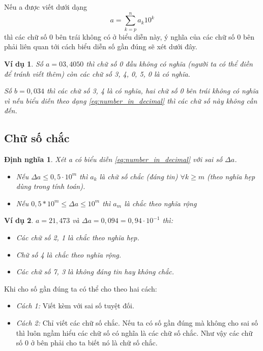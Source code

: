 \documentclass{book}    %
\newtheorem{definition}{Định nghĩa}
\newtheorem{exmp}{Ví dụ}[chapter]
\begin{document}
Nếu a được viết dưới dạng
\begin{equation} \label{eq:number_in_decimal}
    a = \sum_{k=p}^{n} a_k10^k
\end{equation}
thì các chữ số 0 bên trái không có ở biểu diễn này, ý nghĩa của các chữ số 0 bên
phải liên quan tới cách biểu diễn số gần đúng sẽ xét dưới đây.

\begin{exmp}
    Số \(a = 03,4050\) thì chữ số 0 đầu không có nghĩa (người ta có thể điền để
    tránh viết thêm) còn các chữ số 3, 4, 0, 5, 0 là có nghĩa.

    Số \(b = 0,034\) thì các chữ số 3, 4 là có nghĩa, hai chữ số 0 bên trái
    không có nghĩa vì nếu biểu diễn theo dạng \ref{eq:number_in_decimal} thì các
    chữ số này không cần đến.
\end{exmp}

\subsection{Chữ số chắc}

\begin{definition}
    Xét a có biểu diễn \ref{eq:number_in_decimal} với sai số \(\Delta a\).
    \begin{itemize}
        \item Nếu \(\Delta a \leq 0,5 \cdot 10^m\) thì \(a_k\) là \emph{chữ số
            chắc (đáng tin)} \(\forall k \geq m\) (theo nghĩa hẹp dùng trong
            tính toán).
        \item Nếu \(0,5 * 10^m \leq \Delta a \leq 10^m\) thì \(a_m\) là
            \emph{chắc theo nghĩa rộng}
    \end{itemize}
\end{definition}

\begin{exmp}
    \(a = 21,473\) và \(\Delta a = 0,094 = 0,94 \cdot 10^{-1}\) thì:
    \begin{itemize}
        \item Các chữ số 2, 1 là chắc theo nghĩa hẹp.
        \item Chữ số 4 là chắc theo nghĩa rộng.
        \item Các chữ số 7, 3 là không đáng tin hay không chắc.
    \end{itemize}
\end{exmp}

Khi cho số gần đúng ta có thể cho theo hai cách:
\begin{itemize}
    \item \emph{Cách 1:} Viết kèm với sai số tuyệt đối.
    \item \emph{Cách 2:} Chỉ viết các chữ số chắc. Nếu ta có số gần đúng mà
        không cho sai số thì luôn ngầm hiểu các chữ số có nghĩa là các chữ số
        chắc. Như vậy các chữ số 0 ở bên phải cho ta biết nó là chữ số chắc.
\end{itemize}
\end{document}
